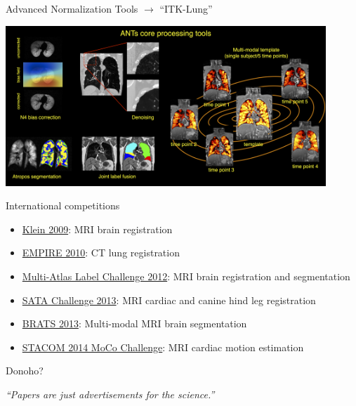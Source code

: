 \documentclass[ignorenonframetext,]{beamer}
\begin{document}
\begin{frame}{Advanced Normalization Tools \(\rightarrow\) ``ITK-Lung''}

\begin{center}

\includegraphics[width=4.75in]{./tools/figures/coreANtsToolsLung.png}

\end{center}

\end{frame}

\begin{frame}{International competitions}

\begin{itemize}
\item
  \href{http://www.ncbi.nlm.nih.gov/pubmed/19195496}{Klein 2009}: MRI
  brain registration
\item
  \href{http://empire10.isi.uu.nl}{EMPIRE 2010}: CT lung registration
\item
  \href{https://masi.vuse.vanderbilt.edu/workshop2012/index.php/Main_Page}{Multi-Atlas
  Label Challenge 2012}: MRI brain registration and segmentation
\item
  \href{https://masi.vuse.vanderbilt.edu/workshop2013/index.php/MICCAI_2013_SATA_Challenge_and_Workshop:Current_events}{SATA
  Challenge 2013}: MRI cardiac and canine hind leg registration
\item
  \href{http://martinos.org/qtim/miccai2013/}{BRATS 2013}: Multi-modal
  MRI brain segmentation
\item
  \href{http://www.cardiacatlas.org/web/stacom2014/moco-introduction}{STACOM
  2014 MoCo Challenge}: MRI cardiac motion estimation
\end{itemize}

\end{frame}

\begin{frame}{Donoho?}

\centering

\emph{``Papers are just advertisements for the science.''}

\end{frame}
\end{document}
